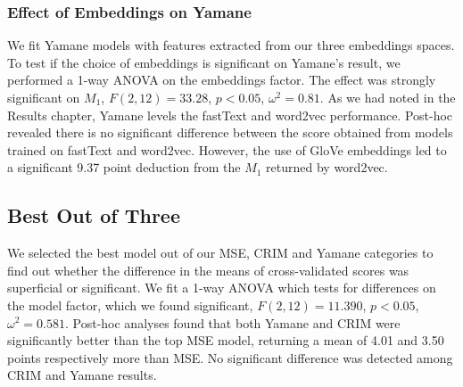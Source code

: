 \subsubsection{Effect of Embeddings on Yamane}
We fit Yamane models with features extracted from our three embeddings spaces.  To test if the choice of embeddings is significant on Yamane's result, we performed a 1-way \ac{ANOVA} on the embeddings factor.  The effect was strongly significant on $M_1$, $F(2,12)=33.28$, $p < 0.05$, $\omega^2=0.81$.  As we had noted in the Results chapter, Yamane levels the fastText and word2vec performance.  Post-hoc revealed there is no significant difference between the score obtained from models trained on fastText and word2vec.  However, the use of GloVe embeddings led to a significant 9.37 point deduction from the $M_1$ returned by word2vec.

\subsection{Best Out of Three}\label{Eval_BestOutOf3}
We selected the best model out of our \ac{MSE}, CRIM and Yamane categories to find out whether the difference in the means of cross-validated scores was superficial or significant.  We fit a 1-way \ac{ANOVA} which tests for differences on the model factor, which we found significant, $F(2,12)=11.390$, $p < 0.05$, $\omega^2=0.581$.  Post-hoc analyses found that both Yamane and CRIM were significantly better than the top \ac{MSE} model, returning a mean of 4.01 and 3.50 points respectively more than \ac{MSE}.  No significant difference was detected among CRIM and Yamane results.

